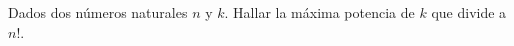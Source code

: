 \begin{statement}{24}
  Dados dos n\'umeros naturales $n$ y $k$. Hallar la m\'axima potencia de $k$
  que divide a $n!$.
\end{statement}
